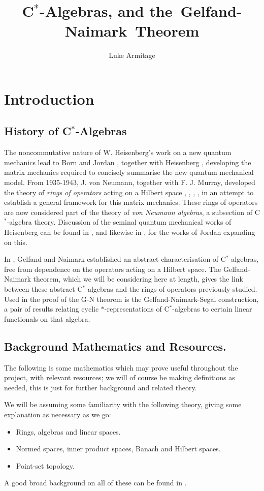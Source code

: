 \documentclass[12pt,a4paper]{amsart}
\author{Luke Armitage}
\title{C$^\ast$-Algebras, and the~Gelfand-Naimark~Theorem}
\theoremstyle{plain}
\theoremstyle{definition}
\begin{document}
\maketitle
\section{Introduction}
\subsection{History of C$^\ast$-Algebras}
	The noncommutative nature of W. Heisenberg's work on a new quantum mechanics \cite{heisenberg25} lead to Born and Jordan \cite{bornjordan25}, together with Heisenberg \cite{bornjordanheisenberg25}, developing the matrix mechanics required to concisely summarise the new quantum mechanical model. 
	From 1935-1943, J. von Neumann, together with F. J. Murray, developed the theory of \emph{rings of operators} acting on a Hilbert space \cite{vonneumann35}, \cite{vonneumann37}, \cite{vonneumann40}, \cite{vonneumann43}, in an attempt to establish a general framework for this matrix mechanics.
	These rings of operators are now considered part of the theory of \emph{von Neumann algebras}, a subsection of C$^\ast$-algebra theory. 
	Discussion of the seminal quantum mechanical works of Heisenberg can be found in \cite{mackinnon77}, and likewise in \cite{schroer03}, for the works of Jordan expanding on this.
	
	In \cite{gelfand43}, Gelfand and Naimark established an abstract characterisation of C$^\ast$-algebras, free from dependence on the operators acting on a Hilbert space.
	The Gelfand-Naimark theorem, which we will be considering here at length, gives the link between these abstract C$^\ast$-algebras and the rings of operators previously studied.
	Used in the proof of the G-N theorem is the Gelfand-Naimark-Segal construction, a pair of results relating cyclic $\ast$-representations of C$^\ast$-algebras to certain linear functionals on that algebra. 
	
	
\subsection{Background Mathematics and Resources.}	
	The following is some mathematics which may prove useful throughout the project, with relevant resources; we will of course be making definitions as needed, this is just for further background and related theory.

	We will be assuming some familiarity with the following theory, giving some explanation as necessary as we go:
\begin{itemize}
	\item Rings, algebras and linear spaces.
	\item Normed spaces, inner product spaces, Banach and Hilbert spaces.
	\item Point-set topology.
\end{itemize}
	A good broad background on all of these can be found in \cite{simmons83}.
\end{document}
